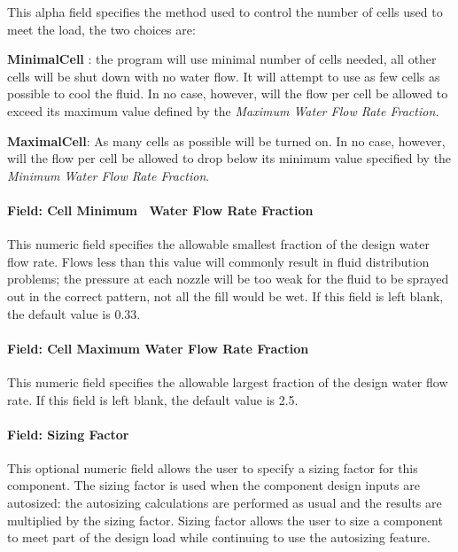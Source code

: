 This alpha field specifies the method used to control the number of cells used to meet the load, the two choices are:

\textbf{MinimalCell} : the program will use minimal number of cells needed, all other cells will be shut down with no water flow. It will attempt to use as few cells as possible to cool the fluid. In no case, however, will the flow per cell be allowed to exceed its maximum value defined by the \emph{Maximum Water Flow Rate Fraction.}

\textbf{MaximalCell}: As many cells as possible will be turned on. In no case, however, will the flow per cell be allowed to drop below its minimum value specified by the \emph{Minimum Water Flow Rate Fraction}.

\paragraph{Field: Cell Minimum~ Water Flow Rate Fraction}\label{field-cell-minimum-water-flow-rate-fraction-2}

This numeric field specifies the allowable smallest fraction of the design water flow rate. Flows less than this value will commonly result in fluid distribution problems; the pressure at each nozzle will be too weak for the fluid to be sprayed out in the correct pattern, not all the fill would be wet. If this field is left blank, the default value is 0.33.

\paragraph{Field: Cell Maximum Water Flow Rate Fraction}\label{field-cell-maximum-water-flow-rate-fraction-2}

This numeric field specifies the allowable largest fraction of the design water flow rate. If this field is left blank, the default value is 2.5.

\paragraph{Field: Sizing Factor}\label{field-sizing-factor-1}

This optional numeric field allows the user to specify a sizing factor for this component. The sizing factor is used when the component design inputs are autosized: the autosizing calculations are performed as usual and the results are multiplied by the sizing factor. Sizing factor allows the user to size a component to meet part of the design load while continuing to use the autosizing feature.

